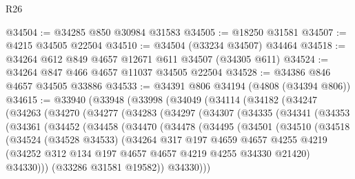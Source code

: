 \begin{lexlean}{R26}
\begin{coremodule}
@34504 := @34285 @850 @30984 @31583
@34505 := @18250 @31581
@34507 := @4215 @34505 @22504
@34510 := @34504 (@33234 @34507) @34464
@34518 := @34264 @612 @849 @4657 @12671 @611 @34507 (@34305 @611)
@34524 := @34264 @847 @466 @4657 @11037 @34505 @22504
@34528 := @34386 @846 @4657 @34505 @33886
@34533 := @34391 @806 @34194 (@4808 (@34394 @806))
@34615 := @33940
    (@33948
      (@33998
        (@34049
          (@34114
            (@34182
              (@34247
                (@34263
                  (@34270
                    (@34277
                      (@34283
                        (@34297
                          (@34307
                            (@34335
                              (@34341
                                (@34353
                                  (@34361
                                    (@34452
                                      (@34458
                                        (@34470
                                          (@34478
                                            (@34495
                                              (@34501
                                                (@34510
                                                  (@34518
                                                    (@34524
                                                      (@34528 @34533)
                                                      (@34264
                                                        @317
                                                        @197
                                                        @4659
                                                        @4657
                                                        @4255
                                                        @4219
                                                        (@34252
                                                          @312
                                                          @134
                                                          @197
                                                          @4657
                                                          @4657
                                                          @4219
                                                          @4255
                                                          @34330
                                                          @21420)
                                                        @34330)))
                                                  (@33286 @31581 @19582))
                                                @34330)))

\end{coremodule}
\end{lexlean}

